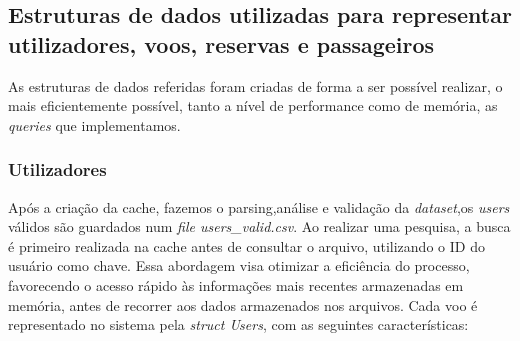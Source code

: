 \documentclass[11pt]{article}
\begin{document}
    \subsection{Estruturas de dados utilizadas para representar utilizadores, voos, reservas e passageiros}
    As estruturas de dados referidas foram criadas de forma a ser possível realizar, o mais eficientemente possível, tanto a nível de performance como de memória, as \textit{queries} que implementamos.

\subsubsection{Utilizadores}

   Após a criação da cache, fazemos o parsing,análise e validação da \textit{dataset},os \textit{users} válidos são guardados num \textit{file users_valid.csv}. Ao realizar uma pesquisa, a busca é primeiro realizada na cache antes de consultar o arquivo, utilizando o ID do usuário como chave. Essa abordagem visa otimizar a eficiência do processo, favorecendo o acesso rápido às informações mais recentes armazenadas em memória, antes de recorrer aos dados armazenados nos arquivos.
    Cada voo é representado no sistema pela \textit{struct Users}, com as seguintes características:
    
\end{document}
